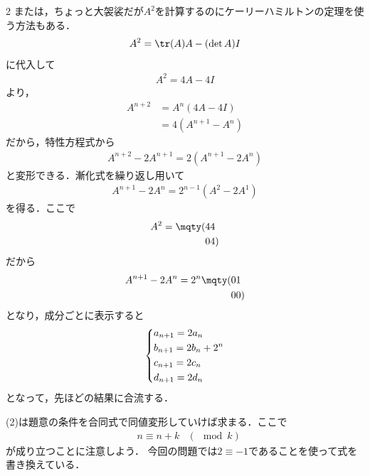 \documentclass[../../main.tex]{subfiles}
\begin{document}
\begin{multicols}{2}
  または，ちょっと大袈裟だが$A^2$を計算するのにケーリーハミルトンの定理を使う方法もある．
  \begin{align*}
    A^2 = \tr(A)A - (\det A)I
  \end{align*}
  に代入して
  \begin{align*}
    A^2 = 4 A - 4I
  \end{align*}
  より，
  \begin{align*}
    A^{n+2}
     & = A^{n} \left(4A-4I\right)       \\
     & = 4 \left(A^{n+1} - A^{n}\right)
  \end{align*}
  だから，特性方程式から
  \begin{align*}
    A^{n+2} - 2 A^{n+1} = 2\left(A^{n+1}-2 A^{n}\right)
  \end{align*}
  と変形できる．漸化式を繰り返し用いて
  \begin{align*}
    A^{n+1} - 2 A^{n} = 2^{n-1} \left(A^{2}- 2 A^{1}\right)
  \end{align*}
  を得る．ここで
  \begin{align*}
    A^{2} = \mqty(4 & 4 \\ 0 & 4)
  \end{align*}
  だから
  \begin{align*}
    A^{n+1} - 2 A^{n} = 2^{n} \mqty(0 & 1 \\ 0 & 0)
  \end{align*}
  となり，成分ごとに表示すると
  \begin{align*}
    \begin{dcases}
      a_{n+1} = 2 a_{n}         \\
      b_{n+1} = 2 b_{n} + 2^{n} \\
      c_{n+1} = 2 c_{n}         \\
      d_{n+1} = 2 d_{n}
    \end{dcases}
  \end{align*}
  となって，先ほどの結果に合流する．

  \vspace{10pt}
  (2)は題意の条件を合同式で同値変形していけば求まる．ここで
  \begin{align*}
     & n \equiv n+k & (\mod k)
  \end{align*}
  が成り立つことに注意しよう．
  今回の問題では$2 \equiv -1$であることを使って式を書き換えている．

  \newpage
\end{multicols}
\end{document}
